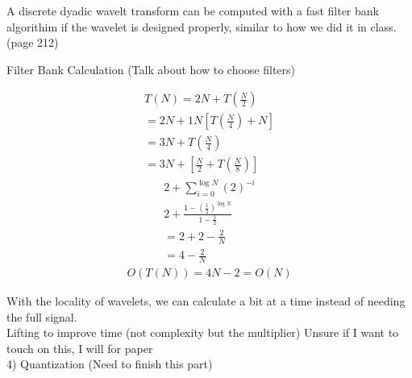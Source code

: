 \documentclass{article}
\begin{document}
	A discrete dyadic wavelt transform can be computed with a fast filter bank algorithim if the wavelet is designed properly, similar to how we did it in class. (page 212)




	Filter Bank Calculation
	(Talk about how to choose filters)

	\begin{align*}
		T(N) = 2N + T\left(\frac{N}{2}\right) \\ 
		=  2N + 1N [ T\left(\frac{N}{4}\right) + N] \\ 
		= 3N + T\left(\frac{N}{4}\right) \\ 
		= 3N + [\frac{N}{2} + T\left(\frac{N}{8}\right) ]
	\end{align*}
	\begin{align*}
		2+ \sum_{i=0}^{\log N} (2)^{-i} \\ 
		2 + \frac{1-(\frac{1}{2})^{\log N}}{1-\frac{1}{2}} \\
		= 2 + 2 - \frac{2}{N} \\ 
		= 4 - \frac{2}{N}  
	\end{align*}
	\begin{align*}
		O(T(N)) = 4N -2 = O(N)
	\end{align*}

	With the locality of wavelets, we can calculate a bit at a time instead of needing the full signal. \\ 

	Lifting to improve time (not complexity but the multiplier) Unsure if I want to touch on this, I will for paper\\

	4) Quantization (Need to finish this part)
\end{document}
